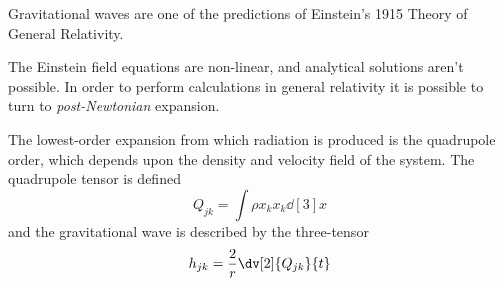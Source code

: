 Gravitational waves are one of the predictions of Einstein's 1915
Theory of General Relativity.


The Einstein field equations are non-linear, and analytical solutions
aren't possible. In order to perform calculations in general
relativity it is possible to turn to  \emph{post-Newtonian} expansion. 

The lowest-order expansion from which radiation is produced is the
quadrupole order, which depends upon the density and velocity field of
the system. The quadrupole tensor is defined
\begin{equation}
  \label{eq:1}
  Q_{jk} = \int \rho x_k x_k \dd[3]{x}
\end{equation}
and the gravitational wave is described by the three-tensor
\begin{equation}
  \label{eq:2}
  h_{jk} = \frac{2}{r} \dv[2]{Q_{jk}}{t}
\end{equation}


